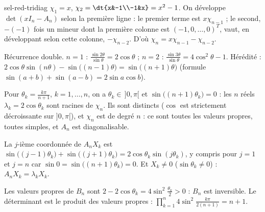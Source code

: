 \begin{corrige}{sel-red-tridiag}
 $\chi_1=x$, $\chi_2=\dt{x&-1\\-1&x}=x^2-1$. On développe $\det(xI_n-A_n)$ selon la première ligne : le premier terme est
$x\chi_{n-1}$ ; le second, $-(-1)$ fois un mineur dont la première colonne est $(-1,0,\dots,0)^T$, vaut, en développant selon cette
colonne, $-\chi_{n-2}$. D'où $\chi_n=x\chi_{n-1}-\chi_{n-2}$.

 Récurrence double. $n=1$ : $\frac{\sin2\theta}{\sin\theta}=2\cos\theta$ ; $n=2$ : $\frac{\sin3\theta}{\sin\theta}=4\cos^2\theta-1$.
Hérédité : $2\cos\theta\sin(n\theta)-\sin\big((n-1)\theta\big)=\sin\big((n+1)\theta\big)$ (formule $\sin(a+b)+\sin(a-b)=2\sin a\cos b$).

 Pour $\theta_k=\frac{k\pi}{n+1}$, $k=1,\dots,n$, on a $\theta_k\in\,]0,\pi[$ et $\sin\big((n+1)\theta_k\big)=0$ : les $n$ réels
$\lambda_k=2\cos\theta_k$ sont racines de $\chi_n$. Ils sont distincts ($\cos$ est strictement décroissante sur $]0,\pi[$), et
$\chi_n$ est de degré $n$ : ce sont toutes les valeurs propres, toutes simples, et $A_n$ est diagonalisable.

 La $j$-ième coordonnée de $A_nX_k$ est $\sin\big((j-1)\theta_k\big)+\sin\big((j+1)\theta_k\big)=2\cos\theta_k\sin(j\theta_k)$, y compris
pour $j=1$ et $j=n$ car $\sin0=\sin\big((n+1)\theta_k\big)=0$. Et $X_k\neq0$ ($\sin\theta_k\neq0$) : $A_nX_k=\lambda_kX_k$.

 Les valeurs propres de $B_n$ sont $2-2\cos\theta_k=4\sin^2\frac{\theta_k}2>0$ : $B_n$ est inversible. Le déterminant est le
produit des valeurs propres : $\displaystyle\prod_{k=1}^n4\sin^2\frac{k\pi}{2(n+1)}=n+1$.
\end{corrige}

